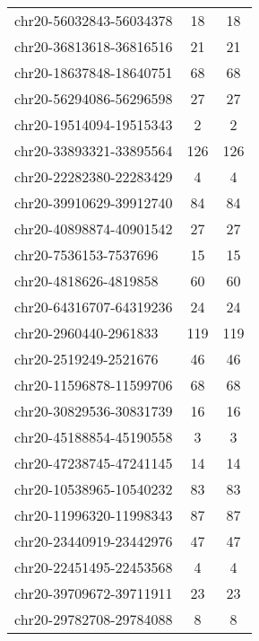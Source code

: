 \begin{longtable}{lSS}
	chr20-56032843-56034378 & 18   & 18                              \\
	chr20-36813618-36816516 & 21   & 21                              \\
	chr20-18637848-18640751 & 68   & 68                              \\
	chr20-56294086-56296598 & 27   & 27                              \\
	chr20-19514094-19515343 & 2    & 2                               \\
	chr20-33893321-33895564 & 126  & 126                             \\
	chr20-22282380-22283429 & 4    & 4                               \\
	chr20-39910629-39912740 & 84   & 84                              \\
	chr20-40898874-40901542 & 27   & 27                              \\
	chr20-7536153-7537696   & 15   & 15                              \\
	chr20-4818626-4819858   & 60   & 60                              \\
	chr20-64316707-64319236 & 24   & 24                              \\
	chr20-2960440-2961833   & 119  & 119                             \\
	chr20-2519249-2521676   & 46   & 46                              \\
	chr20-11596878-11599706 & 68   & 68                              \\
	chr20-30829536-30831739 & 16   & 16                              \\
	chr20-45188854-45190558 & 3    & 3                               \\
	chr20-47238745-47241145 & 14   & 14                              \\
	chr20-10538965-10540232 & 83   & 83                              \\
	chr20-11996320-11998343 & 87   & 87                              \\
	chr20-23440919-23442976 & 47   & 47                              \\
	chr20-22451495-22453568 & 4    & 4                               \\
	chr20-39709672-39711911 & 23   & 23                              \\
	chr20-29782708-29784088 & 8    & 8                               \\

\end{longtable}
